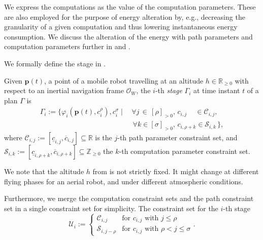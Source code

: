 We express the computations as the value of the computation parameters. These are also employed for the purpose of energy alteration by, e.g., decreasing the granularity of a given computation and thus lowering instantaneous energy consumption. We discuss the alteration of the energy with path parameters and computation parameters further in  and .

We formally define the stage in .

\begin{highlight}  
  \begin{defn}[Stage]\label{def:stage}
    Given $\mathbf{p}(t)$, a point of a mobile robot travelling at an altitude $h\in\mathbb{R}_{\geq 0}$ with respect to an inertial navigation frame $\mathcal{O}_W$, the $i$-th \emph{stage} $\Gamma_i$ at time instant $t$ of a plan $\Gamma$ is
    \begin{equation*}\begin{split}
      \Gamma_i:=\{\varphi_i(\mathbf{p}(t),c_i^\rho),c_i^\sigma\mid
      \,&\forall j\,\in\,[\rho]_{>0},\,c_{i,j}\,\,\,\,\,\,\,\in\mathcal{C}_{i,j},\,\\
        &\,\forall k\in[\sigma]_{>0},\,c_{i,\rho+k}\in\mathcal{S}_{i,k}\,\},
    \end{split}\end{equation*}
    where $\mathcal{C}_{i,j}:=[\underline{c}_{i,j},\overline{c}_{i,j}]\subseteq\mathbb{R}$ is the $j$-th path parameter constraint set, and $\mathcal{S}_{i,k}:=[\underline{c}_{i,\rho+k},\overline{c}_{i,\rho+k}]\subseteq\mathbb{Z}_{\geq 0}$ the $k$-th computation parameter constraint set.
  \end{defn}
\end{highlight}

We note that the altitude $h$ from  is not strictly fixed. It might change at different flying phases for an aerial robot, and under different atmospheric conditions.

Furthermore, we merge the computation constraint sets and the path constraint set in a single constraint set for simplicity. The constraint set for the $i$-th stage
\begin{equation*}
  \mathcal{U}_i:=\begin{cases}
  \mathcal{C}_{i,j} & \text{for } c_{i,j} \text{ with } j\leq\rho\\
  \mathcal{S}_{i,j-\rho} & \text{for } c_{i,j} \text{ with } \rho<j\leq\sigma
\end{cases}.\end{equation*}


